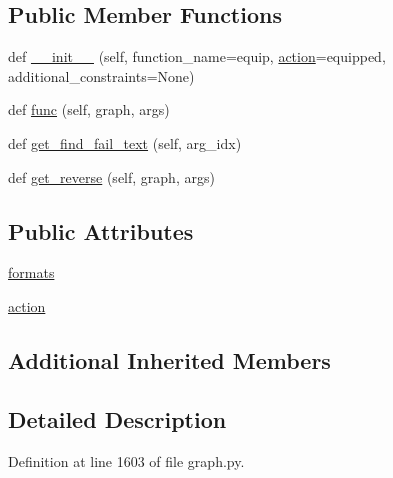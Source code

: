 \subsection*{Public Member Functions}
\begin{DoxyCompactItemize}
\item 
def \hyperlink{classlight__chats_1_1graph_1_1EquipObjectFunction_ae9d5525c470e81b3cd05871ceb0bfc36}{\+\_\+\+\_\+init\+\_\+\+\_\+} (self, function\+\_\+name=\textquotesingle{}equip\textquotesingle{}, \hyperlink{classlight__chats_1_1graph_1_1EquipObjectFunction_a43535bde5e33eb613bddfe618f4a4ef6}{action}=\textquotesingle{}equipped\textquotesingle{}, additional\+\_\+constraints=None)
\item 
def \hyperlink{classlight__chats_1_1graph_1_1EquipObjectFunction_a4eaec48030f12c92dcddf9f976b31604}{func} (self, graph, args)
\item 
def \hyperlink{classlight__chats_1_1graph_1_1EquipObjectFunction_a63956c69d130eb078d3c987b8b220190}{get\+\_\+find\+\_\+fail\+\_\+text} (self, arg\+\_\+idx)
\item 
def \hyperlink{classlight__chats_1_1graph_1_1EquipObjectFunction_aa6c4d9ced2e8732087350592441e82bd}{get\+\_\+reverse} (self, graph, args)
\end{DoxyCompactItemize}
\subsection*{Public Attributes}
\begin{DoxyCompactItemize}
\item 
\hyperlink{classlight__chats_1_1graph_1_1EquipObjectFunction_a798cbf33f30601ca3ac770b472ddbe6c}{formats}
\item 
\hyperlink{classlight__chats_1_1graph_1_1EquipObjectFunction_a43535bde5e33eb613bddfe618f4a4ef6}{action}
\end{DoxyCompactItemize}
\subsection*{Additional Inherited Members}


\subsection{Detailed Description}
\begin{DoxyVerb}
\end{DoxyVerb}
 

Definition at line 1603 of file graph.\+py.



